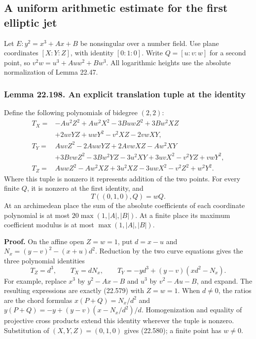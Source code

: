 \documentclass[
  11pt,
  a4paper,
]{article}
\begin{document}
\subsection{A uniform arithmetic estimate for the first elliptic
jet}\label{a-uniform-arithmetic-estimate-for-the-first-elliptic-jet}

Let \(E:y^2=x^3+Ax+B\) be nonsingular over a number field. Use plane
coordinates \([X:Y:Z]\), with identity \([0:1:0]\). Write \(Q=[u:v:w]\)
for a second point, so \(v^2w=u^3+Auw^2+Bw^3\). All logarithmic heights
use the absolute normalization of Lemma 22.47.

\subsubsection{Lemma 22.198. An explicit translation tuple at the
identity}\label{lemma-22.198.-an-explicit-translation-tuple-at-the-identity}

Define the following polynomials of bidegree \((2,2)\): \[
\begin{split}
 T_X={}&-Au^2Z^2+Aw^2X^2-3BuwZ^2+3Bw^2XZ\\
      &+2uvYZ+uwY^2-v^2XZ-2vwXY,\\
 T_Y={}&AuvZ^2-2AuwYZ+2AvwXZ-Aw^2XY\\
      &+3BvwZ^2-3Bw^2YZ-3u^2XY+3uvX^2-v^2YZ+vwY^2,\\
 T_Z={}&AuwZ^2-Aw^2XZ+3u^2XZ-3uwX^2-v^2Z^2+w^2Y^2.
\end{split}
\tag{22.579}
\] Where this tuple is nonzero it represents addition of the two points.
For every finite \(Q\), it is nonzero at the first identity, and \[
 T((0,1,0),Q)=wQ.
 \tag{22.580}
\] At an archimedean place the sum of the absolute coefficients of each
coordinate polynomial is at most \(20\max(1,|A|,|B|)\). At a finite
place its maximum coefficient modulus is at most \(\max(1,|A|,|B|)\).

\textbf{Proof.} On the affine open \(Z=w=1\), put \(d=x-u\) and
\(N_x=(y-v)^2-(x+u)d^2\). Reduction by the two curve equations gives the
three polynomial identities \[
 T_Z=d^3,\qquad T_X=dN_x,\qquad
 T_Y=-yd^3+(y-v)(xd^2-N_x).
 \tag{22.581}
\] For example, replace \(x^3\) by \(y^2-Ax-B\) and \(u^3\) by
\(v^2-Au-B\), and expand. The resulting expressions are exactly (22.579)
with \(Z=w=1\). When \(d\ne0\), the ratios are the chord formulas
\(x(P+Q)=N_x/d^2\) and \(y(P+Q)=-y+(y-v)(x-N_x/d^2)/d\). Homogenization
and equality of projective cross products extend this identity wherever
the tuple is nonzero. Substitution of \((X,Y,Z)=(0,1,0)\) gives
(22.580); a finite point has \(w\ne0\).
\end{document}
